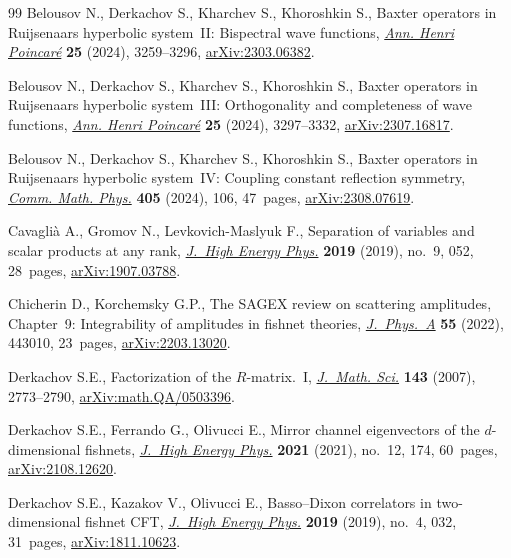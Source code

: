 \begin{thebibliography}{99}
Belousov N., Derkachov S., Kharchev S., Khoroshkin S., Baxter operators in
 {R}uijsenaars hyperbolic system~{II}: {B}ispectral wave functions,
 \href{https://doi.org/10.1007/s00023-023-01385-z}{\textit{Ann. Henri
 Poincar\'e}} \textbf{25} (2024), 3259--3296,
 \href{http://arxiv.org/abs/2303.06382}{arXiv:2303.06382}.

Belousov N., Derkachov S., Kharchev S., Khoroshkin S., Baxter operators in
 {R}uijsenaars hyperbolic system~{III}: {O}rthogonality and completeness of
 wave functions,
 \href{https://doi.org/10.1007/s00023-023-01406-x}{\textit{Ann. Henri
 Poincar\'e}} \textbf{25} (2024), 3297--3332,
 \href{http://arxiv.org/abs/2307.16817}{arXiv:2307.16817}.

Belousov N., Derkachov S., Kharchev S., Khoroshkin S., Baxter operators in
 {R}uijsenaars hyperbolic system~{IV}: {C}oupling constant reflection
 symmetry, \href{https://doi.org/10.1007/s00220-024-04952-5}{\textit{Comm.
 Math. Phys.}} \textbf{405} (2024), 106, 47~pages,
 \href{http://arxiv.org/abs/2308.07619}{arXiv:2308.07619}.

Cavagli\`a A., Gromov N., Levkovich-Maslyuk F., Separation of variables and
 scalar products at any rank,
 \href{https://doi.org/10.1007/jhep09(2019)052}{\textit{J.~High Energy Phys.}}
 \textbf{2019} (2019), no.~9, 052, 28~pages,
 \href{http://arxiv.org/abs/1907.03788}{arXiv:1907.03788}.

Chicherin D., Korchemsky G.P., The {SAGEX} review on scattering amplitudes,
 {C}hapter~9: {I}ntegrability of amplitudes in fishnet theories,
 \href{https://doi.org/10.1088/1751-8121/ac8c72}{\textit{J.~Phys.~A}}
 \textbf{55} (2022), 443010, 23~pages,
 \href{http://arxiv.org/abs/2203.13020}{arXiv:2203.13020}.

Derkachov S.E., Factorization of the {$R$}-matrix.~{I},
 \href{https://doi.org/10.1007/s10958-007-0164-8}{\textit{J.~Math. Sci.}}
 \textbf{143} (2007), 2773--2790,
 \href{http://arxiv.org/abs/math.QA/0503396}{arXiv:math.QA/0503396}.


Derkachov S.E., Ferrando G., Olivucci E., Mirror channel eigenvectors of the
 {$d$}-dimensional fishnets,
 \href{https://doi.org/10.1007/jhep12(2021)174}{\textit{J.~High Energy Phys.}}
 \textbf{2021} (2021), no.~12, 174, 60~pages,
 \href{http://arxiv.org/abs/2108.12620}{arXiv:2108.12620}.

Derkachov S.E., Kazakov V., Olivucci E., Basso--{D}ixon correlators in
 two-dimensional fishnet {CFT},
 \href{https://doi.org/10.1007/jhep04(2019)032}{\textit{J.~High Energy Phys.}}
 \textbf{2019} (2019), no.~4, 032, 31~pages,
 \href{http://arxiv.org/abs/1811.10623}{arXiv:1811.10623}.


\end{thebibliography}
